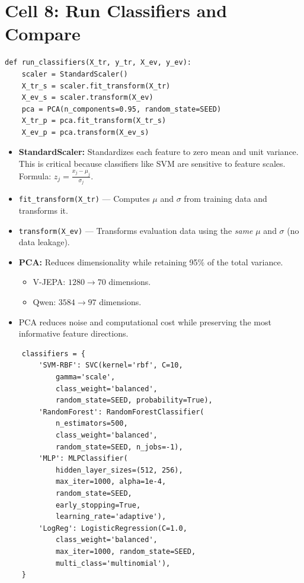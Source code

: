 \newpage
\section{Cell 8: Run Classifiers and Compare}

\begin{lstlisting}
def run_classifiers(X_tr, y_tr, X_ev, y_ev):
    scaler = StandardScaler()
    X_tr_s = scaler.fit_transform(X_tr)
    X_ev_s = scaler.transform(X_ev)
    pca = PCA(n_components=0.95, random_state=SEED)
    X_tr_p = pca.fit_transform(X_tr_s)
    X_ev_p = pca.transform(X_ev_s)
\end{lstlisting}

\begin{explanation}
\begin{itemize}[nosep]
  \item \textbf{StandardScaler:} Standardizes each feature to zero mean and unit variance. This is critical because classifiers like SVM are sensitive to feature scales. Formula: $z_j = \frac{x_j - \mu_j}{\sigma_j}$.
  \item \texttt{fit\_transform(X\_tr)} --- Computes $\mu$ and $\sigma$ from training data and transforms it.
  \item \texttt{transform(X\_ev)} --- Transforms evaluation data using the \textit{same} $\mu$ and $\sigma$ (no data leakage).
  \item \textbf{PCA:} Reduces dimensionality while retaining 95\% of the total variance.
  \begin{itemize}[nosep]
    \item V-JEPA: $1280 \rightarrow 70$ dimensions.
    \item Qwen: $3584 \rightarrow 97$ dimensions.
  \end{itemize}
  \item PCA reduces noise and computational cost while preserving the most informative feature directions.
\end{itemize}
\end{explanation}

\begin{lstlisting}
    classifiers = {
        'SVM-RBF': SVC(kernel='rbf', C=10,
            gamma='scale',
            class_weight='balanced',
            random_state=SEED, probability=True),
        'RandomForest': RandomForestClassifier(
            n_estimators=500,
            class_weight='balanced',
            random_state=SEED, n_jobs=-1),
        'MLP': MLPClassifier(
            hidden_layer_sizes=(512, 256),
            max_iter=1000, alpha=1e-4,
            random_state=SEED,
            early_stopping=True,
            learning_rate='adaptive'),
        'LogReg': LogisticRegression(C=1.0,
            class_weight='balanced',
            max_iter=1000, random_state=SEED,
            multi_class='multinomial'),
    }
\end{lstlisting}

